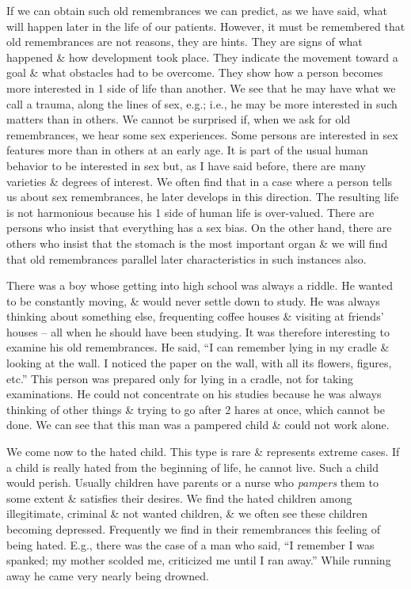 \documentclass{article}
\begin{document}
If we can obtain such old remembrances we can predict, as we have said, what will happen later in the life of our patients. However, it must be remembered that old remembrances are not reasons, they are hints. They are signs of what happened \& how development took place. They indicate the movement toward a goal \& what obstacles had to be overcome. They show how a person becomes more interested in 1 side of life than another. We see that he may have what we call a trauma, along the lines of sex, e.g.; i.e., he may be more interested in such matters than in others. We cannot be surprised if, when we ask for old remembrances, we hear some sex experiences. Some persons are interested in sex features more than in others at an early age. It is part of the usual human behavior to be interested in sex but, as I have said before, there are many varieties \& degrees of interest. We often find that in a case where a person tells us about sex remembrances, he later develops in this direction. The resulting life is not harmonious because his 1 side of human life is over-valued. There are persons who insist that everything has a sex bias. On the other hand, there are others who insist that the stomach is the most important organ \& we will find that old remembrances parallel later characteristics in such instances also.

There was a boy whose getting into high school was always a riddle. He wanted to be constantly moving, \& would never settle down to study. He was always thinking about something else, frequenting coffee houses \& visiting at friends' houses -- all when he should have been studying. It was therefore interesting to examine his old remembrances. He said, ``I can remember lying in my cradle \& looking at the wall. I noticed the paper on the wall, with all its flowers, figures, etc.'' This person was prepared only for lying in a cradle, not for taking examinations. He could not concentrate on his studies because he was always thinking of other things \& trying to go after 2 hares at once, which cannot be done. We can see that this man was a pampered child \& could not work alone.

We come now to the hated child. This type is rare \& represents extreme cases. If a child is really hated from the beginning of life, he cannot live. Such a child would perish. Usually children have parents or a nurse who \textit{pampers} them to some extent \& satisfies their desires. We find the hated children among illegitimate, criminal \& not wanted children, \& we often see these children becoming depressed. Frequently we find in their remembrances this feeling of being hated. E.g., there was the case of a man who said, ``I remember I was spanked; my mother scolded me, criticized me until I ran away.'' While running away he came very nearly being drowned.
\end{document}
